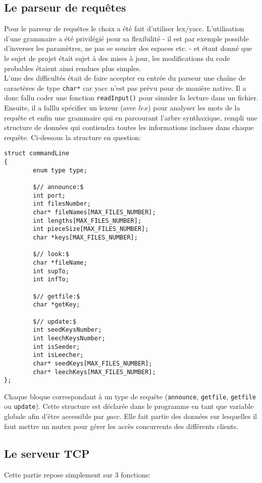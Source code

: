 \subsection{Le parseur de requêtes}
Pour le parseur de requêtes le choix a été fait d'utiliser lex/yacc. L'utilisation d'une grammaire a été privilégié pour sa flexibilité - il est par exemple possible d'inverser les paramètres, ne pas se soucier des espaces etc. - et étant donné que le sujet de projet était sujet à des mises à jour, les modifications du code probables étaient ainsi rendues plus simples.\\
L'une des difficultés était de faire accepter en entrée du parseur une chaîne de caractères de type \texttt{char*} car yacc n'est pas prévu pour de manière native. Il a donc fallu coder une fonction \texttt{readInput()} pour simuler la lecture dans un fichier. Ensuite, il a falllu spécifier un lexeur (avec $lex$) pour analyser les mots de la requête et enfin une grammaire qui en parcourant l'arbre synthaxique, rempli une structure de données qui contiendra toutes les informations incluses dans chaque requête. Ci-dessous la structure en question:

\begin{verbatim}
struct commandLine
{
        enum type type;

        $// announce:$
        int port;
        int filesNumber;
        char* fileNames[MAX_FILES_NUMBER];
        int lengths[MAX_FILES_NUMBER];
        int pieceSize[MAX_FILES_NUMBER];
        char *keys[MAX_FILES_NUMBER];

        $// look:$
        char *fileName;
        int supTo;
        int infTo;

        $// getfile:$
        char *getKey;

        $// update:$
        int seedKeysNumber;
        int leechKeysNumber;
        int isSeeder;
        int isLeecher;
        char* seedKeys[MAX_FILES_NUMBER];
        char* leechKeys[MAX_FILES_NUMBER];
};
\end{verbatim}

Chaque bloque correspondant à un type de requête (\texttt{announce}, \texttt{getfile}, \texttt{getfile} ou \texttt{update}).
Cette structure est déclarée dans le programme en tant que variable globale afin d'être accessible par $yacc$. Elle fait partie des données sur lesquelles il faut mettre un mutex pour gérer les accès concurrents des différents clients.

\subsection{Le serveur TCP}
Cette partie repose simplement sur 3 fonctions:

